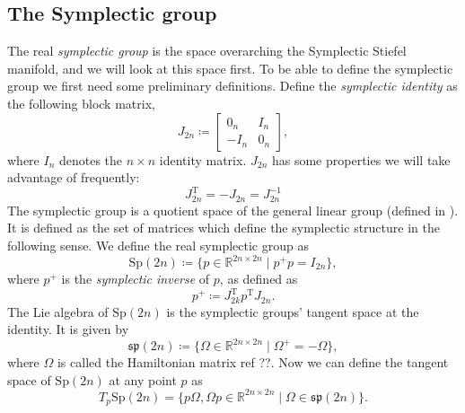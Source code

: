\subsection{The Symplectic group}
The real \textit{symplectic group} is the space overarching the Symplectic Stiefel manifold, and we will look at this space first. To be able to define the symplectic group we first need some preliminary definitions. Define the \textit{symplectic identity} as the following block matrix,
\begin{equation*}
    J_{2n}\coloneqq\begin{bmatrix}
        0_{n} & I_{n} \\
        -I_{n} & 0_{n}
    \end{bmatrix},
\end{equation*}
where $I_{n}$ denotes the $n\times n$ identity matrix. $J_{2n}$ has some properties we will take advantage of frequently:
\begin{equation}\label{eq:J_2n_properties}
    J_{2n} ^{\mathrm{T}}=-J_{2n}=J_{2n}^{-1}
\end{equation}
The symplectic group is a quotient space of the general linear group (defined in ). It is defined as the set of matrices which define the symplectic structure in the following sense. We define the real symplectic group as
\begin{equation}\label{eq:sp_def}
    \mathrm{Sp}(2n)\coloneqq \{p\in \mathbb{R}^{2n\times2n} \;|\; p^{+}p=I_{2n}\},
\end{equation}
where $p^{+}$ is the \textit{symplectic inverse} of $p$, as defined as
\begin{equation}\label{eq:symplectic_inverse}
    p^{+}\coloneqq J_{2k}^{\mathrm{T}}p ^{\mathrm{T}}J_{2n}.
\end{equation}
The Lie algebra of $\mathrm{Sp}(2n)$ is the symplectic groups' tangent space at the identity. It is given by 
\begin{equation}\label{eq:sp_Lie_algebra}
    \mathfrak{sp}(2n)\coloneqq \{\Omega\in \mathbb{R}^{2n\times2n} \;|\; \Omega^{+}=-\Omega\},
\end{equation}
where $\Omega$ is called the Hamiltonian matrix ref ??. 
Now we can define the tangent space of $\mathrm{Sp}(2n)$ at any point $p$  as
\begin{equation}\label{eq:sp_tangent_space}
    T_{p}\mathrm{Sp}(2n)=\{p\Omega,\Omega p\in \mathbb{R}^{2n\times2n} \;|\; \Omega\in\mathfrak{sp}(2n)\}.
\end{equation}


